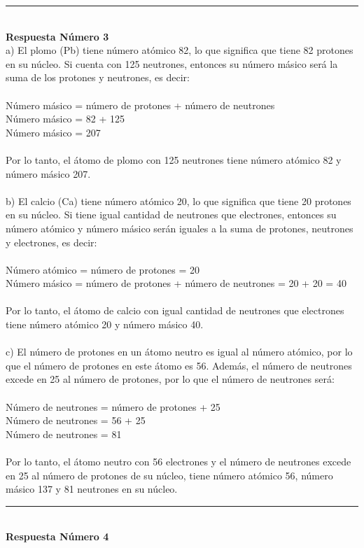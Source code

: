 \documentclass{article}
\begin{document}
\noindent\rule{\textwidth}{1pt} \\
\textbf{Respuesta Número 3} \\
a) El plomo (Pb) tiene número atómico 82, lo que significa que tiene 82 protones en su núcleo. Si cuenta con 125 neutrones, entonces su número másico será la suma de los protones y neutrones, es decir:\\
\\
Número másico = número de protones + número de neutrones\\
Número másico = 82 + 125\\
Número másico = 207\\
\\
Por lo tanto, el átomo de plomo con 125 neutrones tiene número atómico 82 y número másico 207.\\
\\
b) El calcio (Ca) tiene número atómico 20, lo que significa que tiene 20 protones en su núcleo. Si tiene igual cantidad de neutrones que electrones, entonces su número atómico y número másico serán iguales a la suma de protones, neutrones y electrones, es decir:\\
\\
Número atómico = número de protones = 20\\
Número másico = número de protones + número de neutrones = 20 + 20 = 40\\
\\
Por lo tanto, el átomo de calcio con igual cantidad de neutrones que electrones tiene número atómico 20 y número másico 40.\\
\\
c) El número de protones en un átomo neutro es igual al número atómico, por lo que el número de protones en este átomo es 56. Además, el número de neutrones excede en 25 al número de protones, por lo que el número de neutrones será:\\
\\
Número de neutrones = número de protones + 25\\
Número de neutrones = 56 + 25\\
Número de neutrones = 81\\
\\
Por lo tanto, el átomo neutro con 56 electrones y el número de neutrones excede en 25 al número de protones de su núcleo, tiene número atómico 56, número másico 137 y 81 neutrones en su núcleo.\\
\noindent\rule{\textwidth}{1pt} \\
\textbf{Respuesta Número 4} \\
\end{document}
